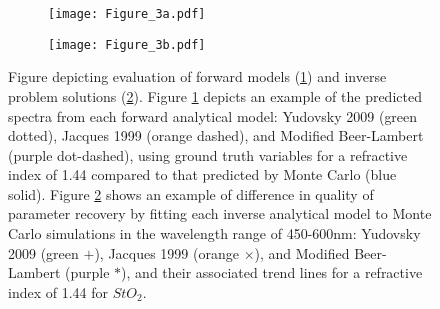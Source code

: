 % 
\begin{figure}[htbp]
    \centering
    \begin{subfigure}{0.8\textwidth}
        \texttt{[image: Figure\_3a.pdf]}
        \caption{}
        \label{fig:egspectrasingle}
    \end{subfigure}
    \begin{subfigure}{0.8\textwidth}
        \texttt{[image: Figure\_3b.pdf]}
        \caption{}
        \label{fig:egtrendsingle}
    \end{subfigure}
    \caption{Figure depicting evaluation of forward models (\ref{fig:egspectrasingle}) and inverse problem solutions (\ref{fig:egtrendsingle}). 
    Figure \ref{fig:egspectrasingle} depicts an example of the predicted spectra from each forward analytical model: Yudovsky 2009 (\textcolor{MyGreen}{green dotted}), Jacques 1999 (\textcolor{MyOrange}{orange dashed}), and Modified Beer-Lambert (\textcolor{MyPurple}{purple dot-dashed}), using ground truth variables for a refractive index of 1.44 compared to that predicted by Monte Carlo (\textcolor{MyBlue}{blue solid}).
    Figure \ref{fig:egtrendsingle} shows an example of difference in quality of parameter recovery by fitting each inverse analytical model to Monte Carlo simulations in the wavelength range of 450-600nm: Yudovsky 2009 (\textcolor{MyGreen}{green $+$}), Jacques 1999 (\textcolor{MyOrange}{orange $\times$}), and Modified Beer-Lambert (\textcolor{MyPurple}{purple $*$}), and their associated trend lines for a refractive index of 1.44 for $StO_2$.}
    \label{fig:FwDandInverse}
\end{figure}

